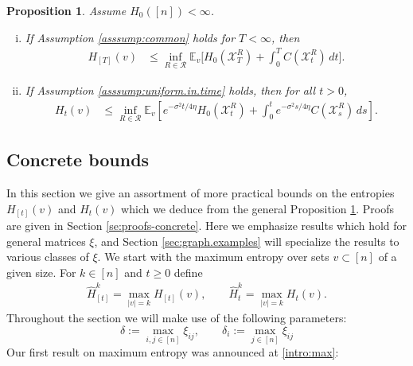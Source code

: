 \documentclass[11pt,reqno]{amsart}
\numberwithin{equation}{section}
\newtheorem{proposition}[theorem]{Proposition}
\theoremstyle{definition}
\def\CC{{C}}
\def\E{{\mathbb E}}
\def\X{{\mathcal X}}
\begin{document}
\begin{proposition} \label{pr:CTMC}
Assume  $H_0([n]) < \infty$.
\begin{enumerate}[(i)]
\item If Assumption \ref{asssump:common} holds for $T < \infty$, then
	\begin{align}
		H_{[T]}(v) &\le\inf_{R \in \mathcal{R}}\E_v\bigg[H_0(\X^{R}_T) + \int_0^T \CC(\X^{R}_t)\, dt\bigg].  \label{ctmc.hierarchy.1}
	\end{align}
	\item If Assumption \ref{asssump:uniform.in.time} holds, then for all $t > 0$, 
	\begin{align}  \label{ctmc.hierarchy.uit.1}
		H_t(v) & \le \inf_{R \in \mathcal{R}} \E_v \left[ e^{-\sigma^2t/4\eta} H_0(\X^{R}_t) + \int_0^t e^{-\sigma^2s/4\eta } \CC(\X^{R}_s) \, ds\right].
	\end{align} 
\end{enumerate} 
\end{proposition}


\subsection{Concrete bounds} \label{se:concrete}


In this section we give an assortment of more practical bounds on the entropies $H_{[t]}(v)$ and $H_t(v)$ which we deduce from the general Proposition \ref{pr:CTMC}. Proofs are given in Section \ref{se:proofs-concrete}. Here we emphasize results which hold for general matrices $\xi$, and Section \ref{sec:graph.examples} will specialize the results to various classes of $\xi$. We start with the maximum entropy over sets $v \subset [n]$ of a given size.
For $k \in [n]$ and $t \ge 0$ define
\begin{align*}
\widehat{H}^{k}_{[t]} = \max_{|v| =k} H_{[t]}(v), \qquad \widehat{H}^{k}_t = \max_{|v| =k} H_t(v).
\end{align*}
Throughout the section we will make use of the following parameters:
\begin{equation}
\delta:=\max_{i,j \in [n]}\xi_{ij}, \qquad \delta_i:=\max_{j\in [n]}\xi_{ij} \label{def:delta=maxentry}
\end{equation}
Our first result on maximum entropy was announced at \eqref{intro:max}:
\end{document}
